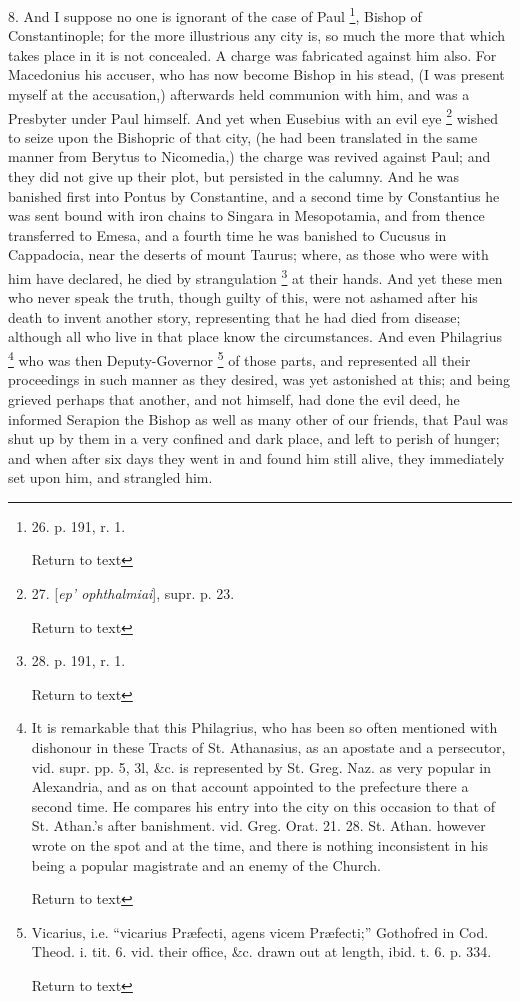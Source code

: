 8. And I suppose no one is ignorant of the case
of Paul \footnote{26.
p. 191, r. 1.

Return to text}, Bishop of
Constantinople; for the more illustrious any city is, so much the more
that which takes place in it is not concealed. A charge was fabricated
against him also. For Macedonius his accuser, who has now become
Bishop in his stead, (I was present myself at the accusation,)
afterwards held communion with him, and was a Presbyter under Paul
himself. And yet when Eusebius with an evil eye \footnote{27.
[\emph{ep' ophthalmiai}], supr. p. 23.

Return to text} wished to seize upon the Bishopric of that city, (he had been
translated in the same manner from Berytus to Nicomedia,) the charge
was revived against Paul; and they did not give up their plot, but
persisted in the calumny. And he was banished first into Pontus by
Constantine, and a second time by Constantius he was sent bound with
iron chains to Singara in Mesopotamia, and from thence transferred to
Emesa, and a fourth time he was banished to Cucusus in
Cappadocia, near the deserts of mount Taurus; where, as those who were
with him have declared, he died by strangulation \footnote{28.
p. 191, r. 1.

Return to text} at their hands. And yet these men who never speak the truth,
though guilty of this, were not ashamed after his death to invent
another story, representing that he had died from disease; although
all who live in that place know the circumstances. And even Philagrius
\footnote{It is remarkable that this Philagrius, who has been so often mentioned
with dishonour in these Tracts of St. Athanasius, as an apostate and a
persecutor, vid. supr. pp. 5, 3l, \&c. is represented by St. Greg.
Naz. as very popular in Alexandria, and as on that account appointed
to the prefecture there a second time. He compares his entry into the
city on this occasion to that of St. Athan.'s after banishment. vid.
Greg. Orat. 21. 28. St. Athan. however wrote on the spot and at the
time, and there is nothing inconsistent in his being a popular
magistrate and an enemy of the Church.

Return to text} who was then
Deputy-Governor \footnote{Vicarius, i.e. ``vicarius Præfecti, agens vicem Præfecti;'' Gothofred
in Cod. Theod. i. tit. 6. vid. their office, \&c. drawn out at
length, ibid. t. 6. p. 334.

Return to text

} of those
parts, and represented all their proceedings in such manner as they
desired, was yet astonished at this; and being grieved perhaps that
another, and not himself, had done the evil deed, he informed Serapion
the Bishop as well as many other of our friends, that Paul was shut up
by them in a very confined and dark place, and left to perish of
hunger; and when after six days they went in and found him still
alive, they immediately set upon him, and strangled him.

